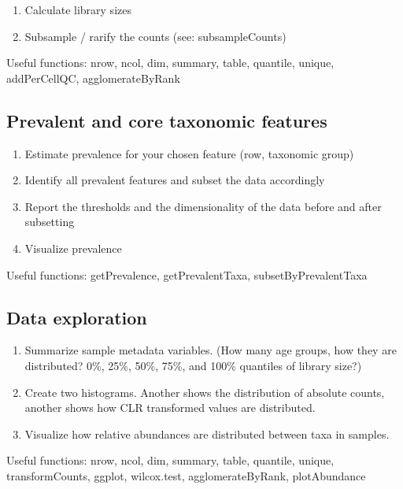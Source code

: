 \documentclass[
]{book}
\providecommand{\tightlist}{%
  \setlength{\itemsep}{0pt}\setlength{\parskip}{0pt}}
\begin{document}
\begin{enumerate}
\def\labelenumi{\arabic{enumi}.}
\tightlist
\item
  Calculate library sizes
\item
  Subsample / rarify the counts (see: subsampleCounts)
\end{enumerate}

Useful functions: nrow, ncol, dim, summary, table, quantile, unique, addPerCellQC, agglomerateByRank

\hypertarget{prevalent-and-core-taxonomic-features}{%
\subsection{Prevalent and core taxonomic features}\label{prevalent-and-core-taxonomic-features}}

\begin{enumerate}
\def\labelenumi{\arabic{enumi}.}
\tightlist
\item
  Estimate prevalence for your chosen feature (row, taxonomic group)
\item
  Identify all prevalent features and subset the data accordingly
\item
  Report the thresholds and the dimensionality of the data before and after subsetting
\item
  Visualize prevalence
\end{enumerate}

Useful functions: getPrevalence, getPrevalentTaxa, subsetByPrevalentTaxa

\hypertarget{data-exploration}{%
\subsection{Data exploration}\label{data-exploration}}

\begin{enumerate}
\def\labelenumi{\arabic{enumi}.}
\tightlist
\item
  Summarize sample metadata variables. (How many age groups, how they are distributed? 0\%, 25\%, 50\%, 75\%, and 100\% quantiles of library size?)
\item
  Create two histograms. Another shows the distribution of absolute counts, another shows how CLR transformed values are distributed.
\item
  Visualize how relative abundances are distributed between taxa in samples.
\end{enumerate}

Useful functions: nrow, ncol, dim, summary, table, quantile, unique, transformCounts, ggplot, wilcox.test, agglomerateByRank, plotAbundance
\end{document}

